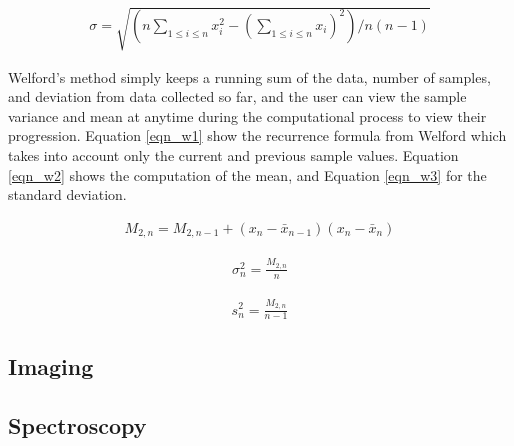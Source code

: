 \documentclass[11pt,sigconf]{acmart}
\begin{document}
\begin{equation} \label{eqn_stddev}
  \begin{split}
    \sigma =\sqrt{(n\sum_{1\leq i\leq n}x_{i}^{2}-(\sum_{1\leq i\leq n} x_{i})^2)/n(n-1)}
  \end{split}
\end{equation}

Welford's method simply keeps a running sum of the data, number of samples, 
and deviation from data collected so far, and the user can view the sample variance and
mean at anytime during the computational process to view their progression. Equation \ref{eqn_w1} show
the recurrence formula from Welford which takes into account only the current and previous sample values.
Equation \ref{eqn_w2} shows the computation of the mean, and Equation \ref{eqn_w3} for the standard deviation. 

\begin{equation} \label{eqn_w1}
  \begin{split}
    M_{2,n}=M_{2,n-1}+(x_n -\bar{x}_{n-1})(x_n -\bar{x}_{n})
  \end{split}
\end{equation}

\begin{equation} \label{eqn_w2}
  \begin{split}
    \sigma_{n}^{2}=\frac{M_{2,n}}{n}
  \end{split}
\end{equation}

\begin{equation} \label{eqn_w3}
  \begin{split}
    s_{n}^{2}=\frac{M_{2,n}}{n-1}
  \end{split}
\end{equation}






\subsection{Imaging}


\subsection{Spectroscopy}
\end{document}
